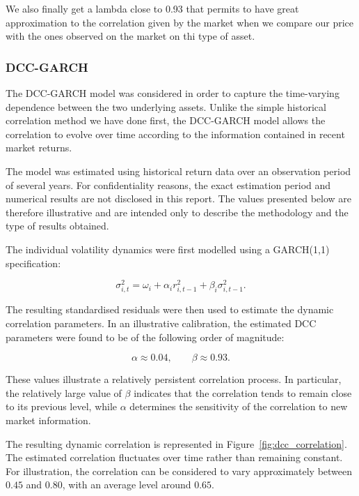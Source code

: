 \documentclass{article}
\begin{document}
We also finally get a lambda close to 0.93 that permits to have great approximation to the correlation given by the market when we compare our price with the ones observed on the market on thi type of asset.


\subsubsection{DCC-GARCH}

The DCC-GARCH model was considered in order to capture the
time-varying dependence between the two underlying assets. Unlike the
simple historical correlation method we have done first, the DCC-GARCH model allows the correlation to evolve over time according to the information contained in recent market returns.

The model was estimated using historical return data over an observation period of several years. For confidentiality reasons, the exact estimation period and numerical results are not disclosed in this report. The values presented below are therefore illustrative and are intended only to describe the methodology and the type of results obtained.

The individual volatility dynamics were first modelled using a GARCH(1,1) specification:

\begin{equation}
\sigma_{i,t}^{2}
=
\omega_i
+
\alpha_i r_{i,t-1}^{2}
+
\beta_i\sigma_{i,t-1}^{2}.
\end{equation}

The resulting standardised residuals were then used to estimate the
dynamic correlation parameters. In an illustrative calibration, the
estimated DCC parameters were found to be of the following order of
magnitude:

\begin{equation}
\alpha \approx 0.04,
\qquad
\beta \approx 0.93.
\end{equation}

These values illustrate a relatively persistent correlation process.
In particular, the relatively large value of $\beta$ indicates that
the correlation tends to remain close to its previous level, while
$\alpha$ determines the sensitivity of the correlation to new market
information.

The resulting dynamic correlation is represented in
Figure~\ref{fig:dcc_correlation}. The estimated correlation fluctuates
over time rather than remaining constant. For illustration, the
correlation can be considered to vary approximately between $0.45$
and $0.80$, with an average level around $0.65$.
\end{document}
